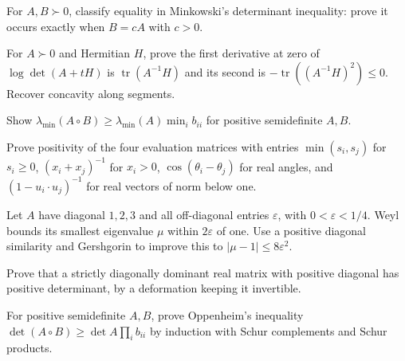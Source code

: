 \begin{exercise}[$\star$]\label{linear:ex:minkowskieq}
For $A,B\succ0$, classify equality in Minkowski's determinant inequality: prove it occurs exactly when $B=cA$ with $c>0$.
\end{exercise}
\begin{exercise}[$\star\star$]\label{linear:ex:logdetderiv}
For $A\succ0$ and Hermitian $H$, prove the first derivative at zero of $\log\det(A+tH)$ is $\operatorname{tr}(A^{-1}H)$ and its second is $-\operatorname{tr}((A^{-1}H)^2)\le0$. Recover concavity along segments.
\end{exercise}
\begin{exercise}[$\star\star$]\label{linear:ex:schurmin}
Show $\lambda_{\min}(A\circ B)\ge\lambda_{\min}(A)\min_ib_{ii}$ for positive semidefinite $A,B$.
\end{exercise}
\begin{exercise}[$\star\star$]\label{linear:ex:kernels}
Prove positivity of the four evaluation matrices with entries $\min(s_i,s_j)$ for $s_i\ge0$, $(x_i+x_j)^{-1}$ for $x_i>0$, $\cos(\theta_i-\theta_j)$ for real angles, and $(1-u_i\cdot u_j)^{-1}$ for real vectors of norm below one.
\end{exercise}
\begin{exercise}[$\star$]\label{linear:ex:gershscale}
Let $A$ have diagonal $1,2,3$ and all off-diagonal entries $\varepsilon$, with $0<\varepsilon<1/4$. Weyl bounds its smallest eigenvalue $\mu$ within $2\varepsilon$ of one. Use a positive diagonal similarity and Gershgorin to improve this to $|\mu-1|\le8\varepsilon^2$.
\end{exercise}
\begin{exercise}[$\star\star$]\label{linear:ex:diagdomdet}
Prove that a strictly diagonally dominant real matrix with positive diagonal has positive determinant, by a deformation keeping it invertible.
\end{exercise}
\begin{exercise}[$\star\star\star$]\label{linear:ex:oppenheim}
For positive semidefinite $A,B$, prove Oppenheim's inequality $\det(A\circ B)\ge\det A\prod_ib_{ii}$ by induction with Schur complements and Schur products.
\end{exercise}

